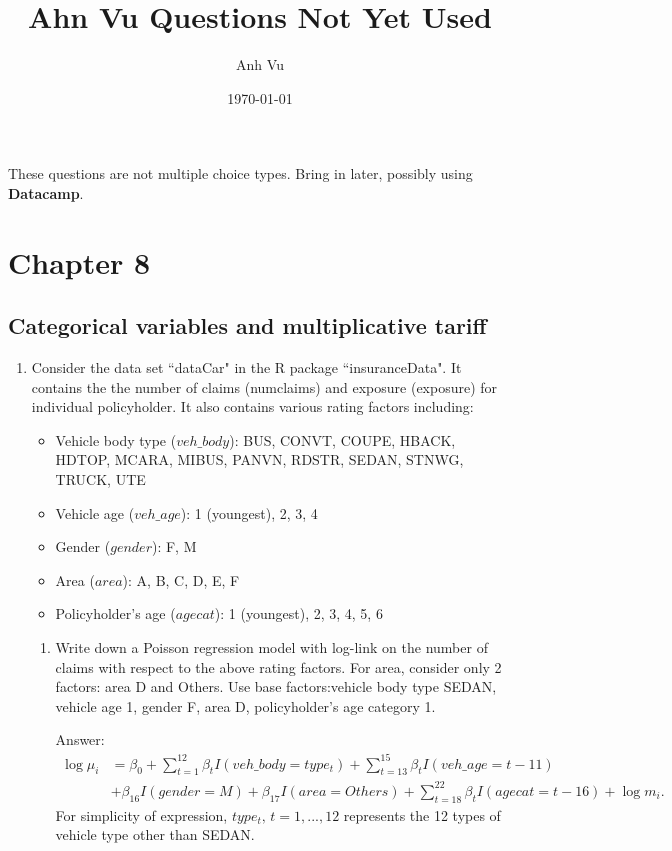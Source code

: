 \documentclass[11pt,a4paper,onecolumn]{article}
\title{Ahn Vu Questions Not Yet Used}
\author{Anh Vu}
\date{\today}
\begin{document}
	\maketitle

These questions are not multiple choice types. Bring in later, possibly using \textbf{Datacamp}.

\section{Chapter 8}

\subsection{Categorical variables and multiplicative tariff}
\begin{enumerate}
\item Consider the data set ``dataCar" in the R package ``insuranceData". It contains the the number of claims (numclaims) and exposure (exposure) for individual policyholder. It also contains various rating factors including:
\begin{itemize}
	\item Vehicle body type (${veh}\_{body}$): BUS, CONVT, COUPE, HBACK, HDTOP, MCARA, MIBUS, PANVN, RDSTR, SEDAN, STNWG, TRUCK, UTE
	\item Vehicle age ($veh\_{age}$): 1 (youngest), 2, 3, 4
	\item Gender ($gender$): F, M
	\item Area ($area$): A, B, C, D, E, F
	\item Policyholder's age ($agecat$): 1 (youngest), 2, 3, 4, 5, 6
\end{itemize}
\begin{enumerate}
	\item Write down a Poisson regression model with log-link on the number of claims with respect to the above rating factors. For area, consider only 2 factors: area D and Others. Use base factors:vehicle body type SEDAN, vehicle age 1, gender F, area D, policyholder's age category 1.  \par
	Answer:
	\begin{align*}
	\log \mu_i & = \beta_0 + \sum_{t=1}^{12}\beta_tI(veh\_body = type_t) + \sum_{t=13}^{15}\beta_tI(veh\_age = t-11) \\
	& + \beta_{16}I(gender = M) +
	  \beta_{17}I(area = Others) + \sum_{t=18}^{22}\beta_tI(agecat = t-16) + \log m_i.
	\end{align*}
  For simplicity of expression, $type_t,\,t=1,...,12$ represents the 12 types of vehicle type other than SEDAN.

\end{enumerate}
\end{enumerate}
\end{document}
